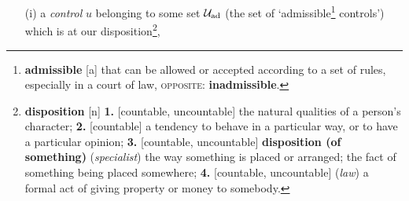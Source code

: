 \documentclass[oneside]{book}
\numberwithin{equation}{section}
\begin{document}
\begin{itemize}
	\item[(i)] a \textit{control} $u$ belonging to some set $\mathcal{U}_{\rm ad}$ (the set of `admissible\footnote{\textbf{admissible} [a] that can be allowed or accepted according to a set of rules, especially in a court of law, \textsc{opposite}: \textbf{inadmissible}.} controls') which is at our disposition\footnote{\textbf{disposition} [n] \textbf{1.} [countable, uncountable] the natural qualities of a person's character; \textbf{2.} [countable] a tendency to behave in a particular way, or to have a particular opinion; \textbf{3.} [countable, uncountable] \textbf{disposition (of something)} (\textit{specialist}) the way something is placed or arranged; the fact of something being placed somewhere; \textbf{4.} [countable, uncountable] (\textit{law}) a formal act of giving property or money to somebody.},

\end{itemize}
\end{document}
